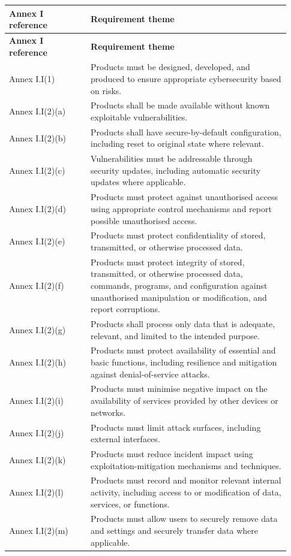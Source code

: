 \documentclass[10pt,a4paper,oneside]{report}
\begin{document}
\begingroup
\scriptsize
\setlength{\tabcolsep}{4pt}
\begin{longtable}{@{}>{\RaggedRight\arraybackslash}p{0.27\linewidth}>{\RaggedRight\arraybackslash}p{0.66\linewidth}@{}}
\toprule
\textbf{Annex I reference} & \textbf{Requirement theme} \\
\midrule
\endfirsthead
\toprule
\textbf{Annex I reference} & \textbf{Requirement theme} \\
\midrule
\endhead
Annex I.I(1) & Products must be designed, developed, and produced to ensure appropriate cybersecurity based on risks. \\
Annex I.I(2)(a) & Products shall be made available without known exploitable vulnerabilities. \\
Annex I.I(2)(b) & Products shall have secure-by-default configuration, including reset to original state where relevant. \\
Annex I.I(2)(c) & Vulnerabilities must be addressable through security updates, including automatic security updates where applicable. \\
Annex I.I(2)(d) & Products must protect against unauthorised access using appropriate control mechanisms and report possible unauthorised access. \\
Annex I.I(2)(e) & Products must protect confidentiality of stored, transmitted, or otherwise processed data. \\
Annex I.I(2)(f) & Products must protect integrity of stored, transmitted, or otherwise processed data, commands, programs, and configuration against unauthorised manipulation or modification, and report corruptions. \\
Annex I.I(2)(g) & Products shall process only data that is adequate, relevant, and limited to the intended purpose. \\
Annex I.I(2)(h) & Products must protect availability of essential and basic functions, including resilience and mitigation against denial-of-service attacks. \\
Annex I.I(2)(i) & Products must minimise negative impact on the availability of services provided by other devices or networks. \\
Annex I.I(2)(j) & Products must limit attack surfaces, including external interfaces. \\
Annex I.I(2)(k) & Products must reduce incident impact using exploitation-mitigation mechanisms and techniques. \\
Annex I.I(2)(l) & Products must record and monitor relevant internal activity, including access to or modification of data, services, or functions. \\
Annex I.I(2)(m) & Products must allow users to securely remove data and settings and securely transfer data where applicable. \\
\bottomrule
\end{longtable}
\endgroup
\end{document}
